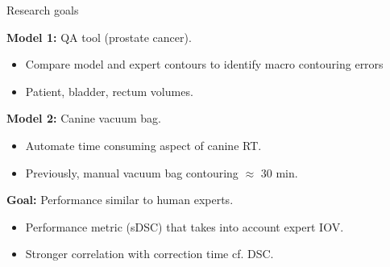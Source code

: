 \documentclass[9pt]{beamer}
\begin{document}
\begin{frame}{Research goals}

\textbf{Model 1:} QA tool (prostate cancer).
\begin{itemize}
\item Compare model and expert contours to identify macro contouring errors
\item Patient, bladder, rectum volumes.

\end{itemize}
\vspace{4mm}

\textbf{Model 2:} Canine vacuum bag.
\begin{itemize}
\item Automate time consuming aspect of canine RT.
\item Previously, manual vacuum bag contouring $\approx$ 30 min.
\end{itemize}
\vspace{3mm}

\textbf{Goal:} Performance similar to human experts.
\begin{itemize}
\item Performance metric (sDSC) that takes into account expert IOV.\footnotemark[4]
\item Stronger correlation with correction time cf. DSC.\footnotemark[5]
\end{itemize}
\end{frame}

\end{document}
